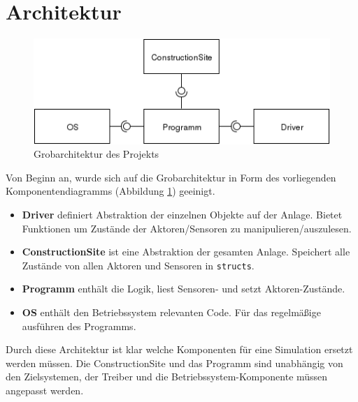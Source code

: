 \documentclass[fontsize=11pt,a4paper,final]{scrartcl}[2003/01/01]
\makeatletter
\def\ScaleIfNeeded{%
	\ifdim\Gin@nat@width>\linewidth
		\linewidth
	\else
		\Gin@nat@width
	\fi
}
\makeatother
\begin{document}
\section{Architektur}
\label{sec:arch}

\begin{figure}[H]
	\centering
	\includegraphics[width=1\ScaleIfNeeded]{Bilder/architektur.png}
	\caption{Grobarchitektur des Projekts}
	\label{fig:Architektur}
\end{figure}
Von Beginn an, wurde sich auf die Grobarchitektur in Form des vorliegenden Komponentendiagramms (Abbildung \ref{fig:Architektur}) geeinigt.

\begin{itemize}
 \item \textbf{Driver} definiert Abstraktion der einzelnen Objekte auf der Anlage. Bietet Funktionen um Zustände der Aktoren/Sensoren zu manipulieren/auszulesen.
 \item \textbf{ConstructionSite} ist eine Abstraktion der gesamten Anlage. Speichert alle Zustände von allen Aktoren und Sensoren in \lstinline|structs|.
 \item \textbf{Programm} enthält die Logik, liest Sensoren- und setzt Aktoren-Zustände.
 \item \textbf{OS} enthält den Betriebssystem relevanten Code. Für das regelmäßige ausführen des Programms.
\end{itemize}

\noindent Durch diese Architektur ist klar welche Komponenten für eine Simulation ersetzt werden müssen. Die ConstructionSite und das Programm sind unabhängig von den Zielsystemen, der Treiber und die Betriebssystem-Komponente müssen angepasst werden.\\
\\
\end{document}

